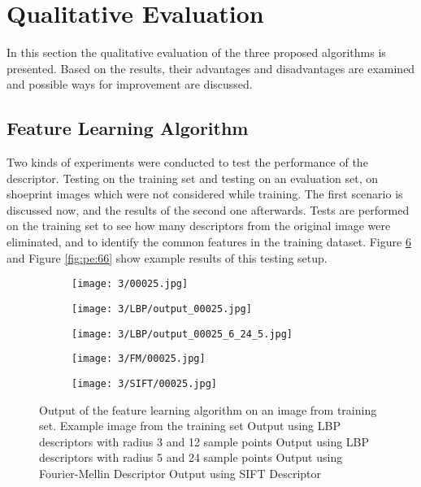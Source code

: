 \documentclass[draft,final]{vutinfth} %
\begin{document}
\section{Qualitative Evaluation}
In this section the qualitative evaluation of the three proposed algorithms is presented.
Based on the results, their advantages and disadvantages are examined and possible ways for improvement are discussed.  
\subsection{Feature Learning Algorithm}
\par
Two kinds of experiments were conducted to test the performance of the descriptor.
Testing on the training set and testing on an evaluation set, on shoeprint images which were not considered while training.
The first scenario is discussed now, and the results of the second one afterwards.
Tests are performed on the training set to see how many descriptors from the original image were eliminated, and to identify the common features in the training dataset.
Figure \ref{fig:pe:25} and Figure \ref{fig:pe:66} show example results of this testing setup.

\begin{figure}[h]
  \centering
  \begin{subfigure}[t]{0.19\columnwidth}
    \centering
    \texttt{[image: 3/00025.jpg]}
    \subcaption{}
    \label{fig:pe:25:orig}
  \end{subfigure}
  \begin{subfigure}[t]{0.19\columnwidth}
    \centering
    \texttt{[image: 3/LBP/output\_00025.jpg]}
    \subcaption{}
    \label{fig:pe:25:LBPs}
  \end{subfigure}
  \begin{subfigure}[t]{0.19\columnwidth}
    \centering
    \texttt{[image: 3/LBP/output\_00025\_6\_24\_5.jpg]}
    \subcaption{}
    \label{fig:pe:25:LBPb}
  \end{subfigure}
  \begin{subfigure}[t]{0.19\columnwidth}
    \centering
    \texttt{[image: 3/FM/00025.jpg]}
    \subcaption{}
    \label{fig:pe:25:FM}
  \end{subfigure}
  \begin{subfigure}[t]{0.19\columnwidth}
    \centering
    \texttt{[image: 3/SIFT/00025.jpg]}
    \subcaption{}
    \label{fig:pe:25:SIFT}
  \end{subfigure}
  \caption{Output of the feature learning algorithm on an image from training set. Example image from the training set  Output using LBP descriptors with radius 3 and 12 sample points  Output using LBP descriptors with radius 5 and 24 sample points  Output using Fourier-Mellin Descriptor  Output using SIFT Descriptor}
  \label{fig:pe:25}
\end{figure}
\end{document}
